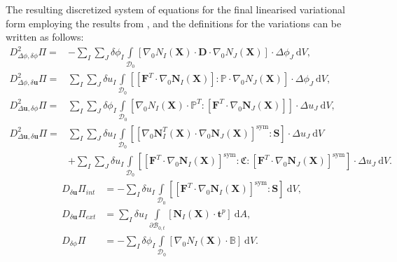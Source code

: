 The resulting discretized system of equations for the final linearised variational form  employing the results from ,  and the definitions for the variations  can be written as follows:
\begin{align}
D^2_{\Delta \phi, \delta \phi} \Pi = &- \sum\limits_I \sum\limits_J \delta \phi_I \int\limits_{\mathcal{D}_0} \left[ \nabla_0 N_I (\mathbf{X}) \cdot \mathbf{D} \cdot \nabla_0 N_J (\mathbf{X}) \right] \cdot \Delta \phi_J \ \mathrm{d}V, \nonumber \\
D^2_{\Delta \phi, \delta \mathbf{u}} \Pi = & \sum\limits_I \sum\limits_J \delta u_I \int\limits_{\mathcal{D}_0} \left[ \left[ \mathbf{F}^T \cdot \nabla_0 \mathbf{N}_I (\mathbf{X}) \right] : \mathbb{P} \cdot \nabla_0 N_J (\mathbf{X}) \right] \cdot \Delta \phi_J \ \mathrm{d}V, \nonumber \\
D^2_{\Delta \mathbf{u}, \delta \phi} \Pi = & \sum\limits_I \sum\limits_J \delta \phi_I \int\limits_{\mathcal{D}_0} \left[ \nabla_0 N_I (\mathbf{X}) \cdot \mathbb{P}^T : \left[ \mathbf{F}^T \cdot \nabla_0 \mathbf{N}_J (\mathbf{X}) \right] \right] \cdot \Delta u_J \ \mathrm{d}V, \nonumber \\
D^2_{\Delta \mathbf{u}, \delta \mathbf{u}} \Pi = & \sum\limits_I \sum\limits_J \delta u_I \int\limits_{\mathcal{D}_0} \left[ \left[ \nabla_0 \mathbf{N}_I^T (\mathbf{X}) \cdot \nabla_0 \mathbf{N}_J (\mathbf{X}) \right]^{\text{sym}} : \mathbf{S} \right] \cdot \Delta u_J \ \mathrm{d}V \nonumber \\
&+ \sum\limits_I \sum\limits_J \delta u_I \int\limits_{\mathcal{D}_0} \left[ \left[ \mathbf{F}^T \cdot \nabla_0 \mathbf{N}_I (\mathbf{X}) \right]^{\text{sym}} : \mathfrak{C} : \left[ \mathbf{F}^T \cdot \nabla_0 \mathbf{N}_J (\mathbf{X}) \right]^{\text{sym}} \right] \cdot \Delta u_J \ \mathrm{d}V.
\label{eq:3.36}
\end{align}
\begin{align}
D_{\delta \mathbf{u}} \Pi_{int} &= - \sum\limits_I \delta u_I \int\limits_{\mathcal{D}_0} \left[ \left[ \mathbf{F}^T \cdot \nabla_0 \mathbf{N}_I (\mathbf{X}) \right]^{\text{sym}} : \mathbf{S} \right] \ \mathrm{d}V, \nonumber \\
D_{\delta \mathbf{u}} \Pi_{ext} &= \sum\limits_I \delta u_I \int\limits_{\partial \mathcal{B}_{0,t}} \left[ \mathbf{N}_I (\mathbf{X}) \cdot \mathbf{t}^p \right] \ \mathrm{d}A, \nonumber \\
D_{\delta \phi} \Pi &= - \sum\limits_I \delta \phi_I \int\limits_{\mathcal{D}_0} \left[ \nabla_0 N_I (\mathbf{X}) \cdot \mathbb{B} \right] \ \mathrm{d}V.
\label{eq:3.37}
\end{align}
